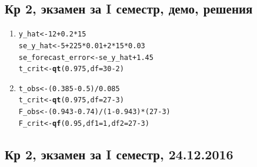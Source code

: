 \documentclass[12pt, a4paper]{article}\usepackage[]{graphicx}\usepackage[]{color}
\makeatletter
\newcommand{\hlnum}[1]{\textcolor[rgb]{0.686,0.059,0.569}{#1}}%
\newcommand{\hlopt}[1]{\textcolor[rgb]{0,0,0}{#1}}%
\newcommand{\hlstd}[1]{\textcolor[rgb]{0.345,0.345,0.345}{#1}}%
\newcommand{\hlkwb}[1]{\textcolor[rgb]{0.69,0.353,0.396}{#1}}%
\newcommand{\hlkwc}[1]{\textcolor[rgb]{0.333,0.667,0.333}{#1}}%
\newcommand{\hlkwd}[1]{\textcolor[rgb]{0.737,0.353,0.396}{\textbf{#1}}}%
\newenvironment{kframe}{%
 \def\at@end@of@kframe{}%
 \ifinner\ifhmode%
  \def\at@end@of@kframe{\end{minipage}}%
  \begin{minipage}{\columnwidth}%
 \fi\fi%
 \def\FrameCommand##1{\hskip\@totalleftmargin \hskip-\fboxsep
 \colorbox{shadecolor}{##1}\hskip-\fboxsep
     \hskip-\linewidth \hskip-\@totalleftmargin \hskip\columnwidth}%
 \MakeFramed {\advance\hsize-\width
   \@totalleftmargin\z@ \linewidth\hsize
   \@setminipage}}%
 {\par\unskip\endMakeFramed%
 \at@end@of@kframe}
\newenvironment{knitrout}{}{} %
\makeatother
\begin{document}
\subsection{Кр 2, экзамен за I семестр, демо, решения}

\begin{enumerate}

\item
\begin{knitrout}
\color{fgcolor}\begin{kframe}
\begin{alltt}
\hlstd{y_hat} \hlkwb{<-} \hlnum{12} \hlopt{+} \hlnum{0.2} \hlopt{*} \hlnum{15}
\hlstd{se_y_hat} \hlkwb{<-} \hlnum{5} \hlopt{+} \hlnum{225} \hlopt{*} \hlnum{0.01} \hlopt{+} \hlnum{2} \hlopt{*} \hlnum{15} \hlopt{*} \hlnum{0.03}
\hlstd{se_forecast_error} \hlkwb{<-} \hlstd{se_y_hat} \hlopt{+} \hlnum{1.45}
\hlstd{t_crit} \hlkwb{<-} \hlkwd{qt}\hlstd{(}\hlnum{0.975}\hlstd{,} \hlkwc{df} \hlstd{=} \hlnum{30} \hlopt{-} \hlnum{2}\hlstd{)}
\end{alltt}
\end{kframe}
\end{knitrout}

\item
\begin{knitrout}
\color{fgcolor}\begin{kframe}
\begin{alltt}
\hlstd{t_obs} \hlkwb{<-} \hlstd{(}\hlnum{0.385}\hlopt{-}\hlnum{0.5}\hlstd{)} \hlopt{/} \hlnum{0.085}
\hlstd{t_crit} \hlkwb{<-} \hlkwd{qt}\hlstd{(}\hlnum{0.975}\hlstd{,} \hlkwc{df} \hlstd{=} \hlnum{27} \hlopt{-} \hlnum{3}\hlstd{)}
\hlstd{F_obs} \hlkwb{<-} \hlstd{(}\hlnum{0.943} \hlopt{-} \hlnum{0.74}\hlstd{)} \hlopt{/} \hlstd{(}\hlnum{1} \hlopt{-} \hlnum{0.943}\hlstd{)} \hlopt{*} \hlstd{(}\hlnum{27} \hlopt{-} \hlnum{3}\hlstd{)}
\hlstd{F_crit} \hlkwb{<-} \hlkwd{qf}\hlstd{(}\hlnum{0.95}\hlstd{,} \hlkwc{df1} \hlstd{=} \hlnum{1}\hlstd{,} \hlkwc{df2} \hlstd{=} \hlnum{27} \hlopt{-} \hlnum{3}\hlstd{)}
\end{alltt}
\end{kframe}
\end{knitrout}

\end{enumerate}



\subsection{Кр 2, экзамен за I семестр, 24.12.2016}
\end{document}
